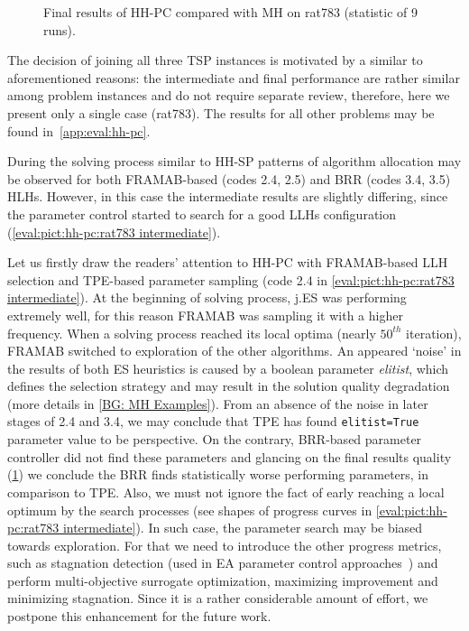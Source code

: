 \begin{figure}[t]
	\centering
	\vspace{-20pt}
	
	\caption{Final results of HH-PC compared with MH on rat783 (statistic of 9 runs).}
	\vspace{-5pt}
	\label{eval:pict:hh-pc:rat783 final}
\end{figure}

The decision of joining all three TSP instances is motivated by a similar to aforementioned reasons: the intermediate and final performance are rather similar among problem instances and do not require separate review, therefore, here we present only a single case (rat783). The results for all other problems may be found in~\cref{app:eval:hh-pc}.

During the solving process similar to HH-SP patterns of algorithm allocation may be observed for both FRAMAB-based (codes 2.4, 2.5) and BRR (codes 3.4, 3.5) HLHs. However, in this case the intermediate results are slightly differing, since the parameter control started to search for a good LLHs configuration (\cref{eval:pict:hh-pc:rat783 intermediate}). 

Let us firstly draw the readers' attention to HH-PC with FRAMAB-based LLH selection and TPE-based parameter sampling (code 2.4 in \cref{eval:pict:hh-pc:rat783 intermediate}). At the beginning of solving process, j.ES was performing extremely well, for this reason FRAMAB was sampling it with a higher frequency. When a solving process reached its local optima (nearly $50^{th}$ iteration), FRAMAB switched to exploration of the other algorithms. An appeared `noise' in the results of both ES heuristics is caused by a boolean parameter \emph{elitist}, which defines the selection strategy and may result in the solution quality degradation (more details in \cref{BG: MH Examples}). From an absence of the noise in later stages of 2.4 and 3.4, we may conclude that TPE has found \texttt{elitist=True} parameter value to be perspective. On the contrary, BRR-based parameter controller did not find these parameters and glancing on the final results quality (\cref{eval:pict:hh-pc:rat783 final}) we conclude the BRR finds statistically worse performing parameters, in comparison to TPE. Also, we must not ignore the fact of early reaching a local optimum by the search processes (see shapes of progress curves in \cref{eval:pict:hh-pc:rat783 intermediate}). In such case, the parameter search may be biased towards exploration. For that we need to introduce the other progress metrics, such as stagnation detection (used in EA parameter control approaches~\cite{karafotias2014generic}) and perform multi-objective surrogate optimization, maximizing improvement and minimizing stagnation. Since it is a rather considerable amount of effort, we postpone this enhancement for the future work.

